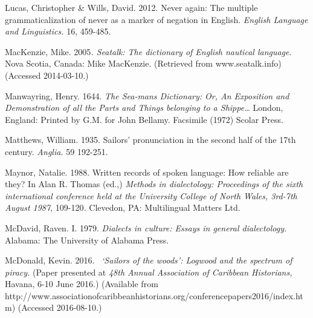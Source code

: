 \begin{styleStandard}
Lucas, Christopher \& Wills, David. 2012. Never again: The multiple grammaticalization of never as a marker of negation in English. \textit{English Language and Linguistics.} 16, 459-485.
\end{styleStandard}


\begin{styleStandard}
MacKenzie, Mike.\textit{ }2005\textit{. Seatalk: The dictionary of English nautical language}. Nova Scotia, Canada: Mike MacKenzie. (Retrieved from www.seatalk.info) (Accessed 2014-03-10.)
\end{styleStandard}


\begin{styleStandard}
Manwayring, Henry. 1644.\textit{ The Sea-mans Dictionary: Or, An Exposition and Demonstration of all the Parts and Things belonging to a Shippe…} London, England: Printed by G.M. for John Bellamy. Facsimile (1972) Scolar Press. 
\end{styleStandard}


\begin{styleStandard}
Matthews, William. 1935. Sailors’ pronunciation in the second half of the 17th century. \textit{Anglia. }59 192-251.
\end{styleStandard}


\begin{styleStandard}
Maynor, Natalie. 1988. Written records of spoken language: How reliable are they? In Alan R. Thomas (ed.,) \textit{Methods in dialectology: Proceedings of the sixth international conference held at the University College of North Wales, 3rd-7th August 1987}, 109-120\textit{.} Clevedon, PA: Multilingual Matters Ltd.
\end{styleStandard}


\begin{styleStandard}
McDavid, Raven. I. 1979. \textit{Dialects in culture: Essays in general dialectology.} Alabama: The University of Alabama Press. 
\end{styleStandard}


\begin{styleStandard}
McDonald, Kevin. 2016. \ \textit{‘Sailors of the woods’: Logwood and the spectrum of piracy. }(Paper presented at \textit{48th Annual Association of Caribbean Historians,} Havana, 6-10 June 2016.) (Available from http://www.associationofcaribbeanhistorians.org/conferencepapers2016/index.htm) (Accessed 2016-08-10.)
\end{styleStandard}


